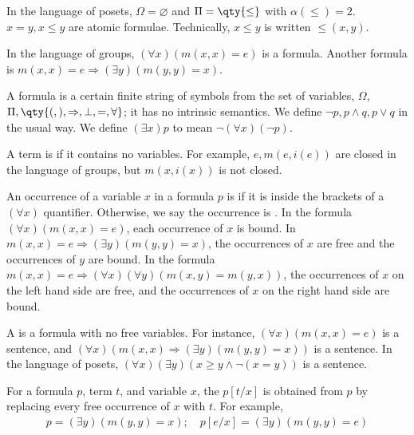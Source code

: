 \begin{example}
    In the language of posets, $\Omega = \varnothing$ and $\Pi = \qty{\leq}$ with $\alpha(\leq) = 2$.
    $x = y, x \leq y$ are atomic formulae.
    Technically, $x \leq y$ is written $\leq(x, y)$.
\end{example}

\begin{example}
    In the language of groups, $(\forall x) (m(x,x) = e)$ is a formula.
    Another formula is $m(x,x) = e \Rightarrow (\exists y) (m(y,y) = x)$.
\end{example}

\begin{remark}
    A formula is a certain finite string of symbols from the set of variables, $\Omega$, $\Pi, \qty{(, ), \implies, \bot, =, \forall}$; it has no intrinsic semantics.
    We define $\neg p, p \wedge q, p \vee q$ in the usual way.
    We define $(\exists x) p$ to mean $\neg(\forall x) (\neg p)$.
\end{remark}

A term is  if it contains no variables.
For example, $e, m(e,i(e))$ are closed in the language of groups, but $m(x,i(x))$ is not closed.

An occurrence of a variable $x$ in a formula $p$ is  if it is inside the brackets of a $(\forall x)$ quantifier.
Otherwise, we say the occurrence is .
In the formula $(\forall x)(m(x,x) = e)$, each occurrence of $x$ is bound.
In $m(x,x) = e \Rightarrow (\exists y)(m(y,y) = x)$, the occurrences of $x$ are free and the occurrences of $y$ are bound.
In the formula $m(x,x) = e \Rightarrow (\forall x)(\forall y)(m(x,y) = m(y,x))$, the occurrences of $x$ on the left hand side are free, and the occurrences of $x$ on the right hand side are bound.

A  is a formula with no free variables.
For instance, $(\forall x)(m(x,x) = e)$ is a sentence, and $(\forall x)(m(x,x) \Rightarrow (\exists y)(m(y,y) = x))$ is a sentence.
In the language of posets, $(\forall x)(\exists y)(x \geq y \wedge \neg(x = y))$ is a sentence.

For a formula $p$, term $t$, and variable $x$, the  $p[t/x]$ is obtained from $p$ by replacing every free occurrence of $x$ with $t$.
For example,
\begin{align*}
    p = (\exists y)(m(y,y) = x);\quad p[e/x] = (\exists y)(m(y,y) = e)
\end{align*}

